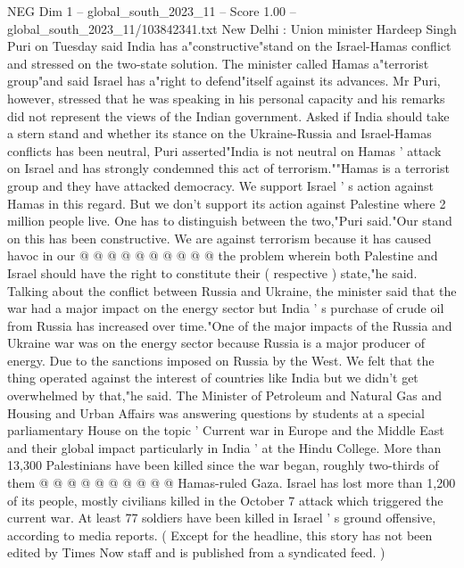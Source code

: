 \begin{textsample}{NEG Dim 1 – global\_south\_2023\_11 – Score 1.00 – global\_south\_2023\_11/103842341.txt}  \label{ex:f1_neg_236}
New Delhi : Union minister Hardeep Singh Puri on Tuesday said India has a"constructive"stand on the Israel-Hamas conflict and stressed on the two-state solution.
The minister called Hamas a"terrorist group"and said Israel has a"right to defend"itself against its advances.
Mr Puri, however, stressed that he was speaking in his personal capacity and his remarks did not represent the views of the Indian government.
Asked if India should take a stern stand and whether its stance on the Ukraine-Russia and Israel-Hamas conflicts has been neutral, Puri asserted"India is not neutral on Hamas ' attack on Israel and has strongly condemned this act of terrorism.""Hamas is a terrorist group and they have attacked democracy.
We support Israel ' s action against Hamas in this regard.
But we don't support its action against Palestine where 2 million people live.
One has to distinguish between the two,"Puri said."Our stand on this has been constructive.
We are against terrorism because it has caused havoc in our @ @ @ @ @ @ @ @ @ @ the problem wherein both Palestine and Israel should have the right to constitute their ( respective ) state,"he said.
Talking about the conflict between Russia and Ukraine, the minister said that the war had a major impact on the energy sector but India ' s purchase of crude oil from Russia has increased over time."One of the major impacts of the Russia and Ukraine war was on the energy sector because Russia is a major producer of energy.
Due to the sanctions imposed on Russia by the West.
We felt that the thing operated against the interest of countries like India but we didn't get overwhelmed by that,"he said.
The Minister of Petroleum and Natural Gas and Housing and Urban Affairs was answering questions by students at a special parliamentary House on the topic ' Current war in Europe and the Middle East and their global impact particularly in India ' at the Hindu College.
More than 13,300 Palestinians have been killed since the war began, roughly two-thirds of them @ @ @ @ @ @ @ @ @ @ Hamas-ruled Gaza.
Israel has lost more than 1,200 of its people, mostly civilians killed in the October 7 attack which triggered the current war.
At least 77 soldiers have been killed in Israel ' s ground offensive, according to media reports. ( Except for the headline, this story has not been edited by Times Now staff and is published from a syndicated feed. )

\end{textsample}
